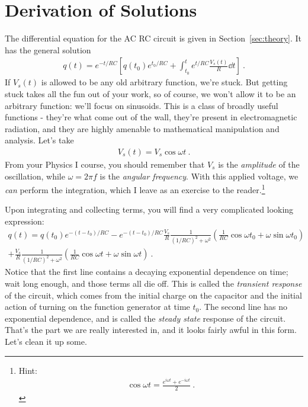 \documentclass[12pt]{article}
\begin{document}
\appendix

\section{Derivation of Solutions}
\label{sec:solutions}

The differential equation for the AC RC circuit is given in
Section~\ref{sec:theory}.  It has the general solution
\begin{gather*}
  q(t) = e^{-t/RC} \left[ 
    q(t_0) e^{t_0/RC} + \int_{t_0}^t e^{t/RC} \frac{V_s(t)}{R} \dd t
\right]\ .
\end{gather*}
If $V_s(t)$ is allowed to be any old arbitrary function, we're stuck.
But getting stuck takes all the fun out of your work, so of course, we
won't allow it to be an arbitrary function: we'll focus on sinusoids.
This is a class of broadly useful functions - they're what come out of
the wall, they're present in electromagnetic radiation, and they are
highly amenable to mathematical manipulation and analysis.  Let's take 
\begin{gather*}
  V_s(t) = V_s \cos \omega t\ .
\end{gather*}
From your Physics I course, you should remember that $V_s$ is the
\textit{amplitude} of the oscillation, while $\omega = 2 \pi f$ is the
\textit{angular frequency}.  With this applied voltage, we
\textit{can} perform the integration, which I leave as an exercise to
the reader.\footnote{Hint:
  \begin{gather*}
    \cos \omega t = \frac{e^{i\omega t} + e^{-i\omega t}}{2}\ .
  \end{gather*}
}

Upon integrating and collecting terms, you will find a very
complicated looking expression:
\begin{multline*}
  q(t) = q(t_0) e^{-(t-t_0)/RC} 
  - e^{-(t-t_0)/RC} \frac{V_s}{R} \frac{1}{(1/RC)^2 + \omega^2} 
  \left( \frac{1}{RC} \cos \omega t_0 + \omega \sin \omega t_0 \right) \\
  + \frac{V_s}{R} \frac{1}{(1/RC)^2 + \omega^2} 
  \left( \frac{1}{RC} \cos \omega t + \omega \sin \omega t \right)\ .
\end{multline*}
Notice that the first line contains a decaying exponential dependence
on time; wait long enough, and those terms all die off.  This is
called the \textit{transient response} of the circuit, which comes
from the initial charge on the capacitor and the initial action of
turning on the function generator at time $t_0$.  The second line has
no exponential dependence, and is called the \textit{steady state}
response of the circuit.  That's the part we are really interested in,
and it looks fairly awful in this form.  Let's clean it up some.
\end{document}

